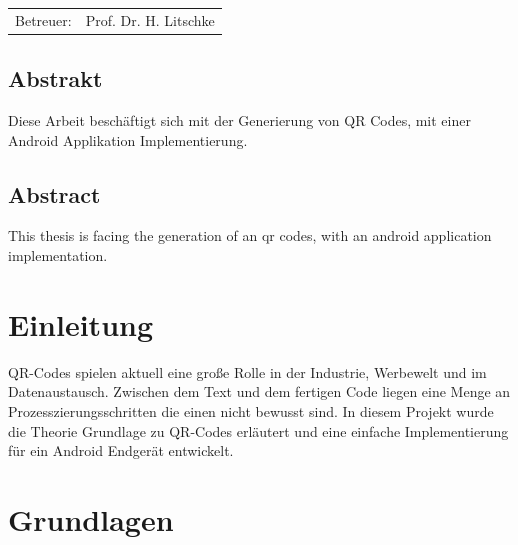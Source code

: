 \documentclass[12pt,					%
							 oneside,			%
							 a4paper,			%
							 halfparskip,		%
							 liststotoc,			%
							 bibtotoc,			%
							 fleqn,				%
							 pointlessnumbers]	%
							 {scrreprt}
\newcommand{\Betreuer}{Prof. Dr. H. Litschke}
\begin{document}
\begin{titlepage}
\begin{center}
\begin{table}[b]
\begin{tabular}{rl}
					Betreuer: & \Betreuer \\

				\end{tabular}
			\end{table}
		\end{center}
	\end{titlepage}

	\onehalfspacing 					%
	

	
\section*{Abstrakt}
Diese Arbeit beschäftigt sich mit der Generierung von QR Codes, mit einer Android Applikation Implementierung.
\section*{Abstract}
This thesis is facing the generation of an qr codes, with an android application implementation.
\tableofcontents
{} 					%

\chapter{Einleitung}
QR-Codes spielen aktuell eine große Rolle in der Industrie, Werbewelt und im Datenaustausch. Zwischen dem Text und dem fertigen Code liegen eine Menge an Prozesszierungsschritten die einen nicht bewusst sind.
In diesem Projekt wurde die Theorie Grundlage zu QR-Codes erläutert und eine einfache Implementierung für ein Android Endgerät entwickelt.

\chapter{Grundlagen}
\end{document}
